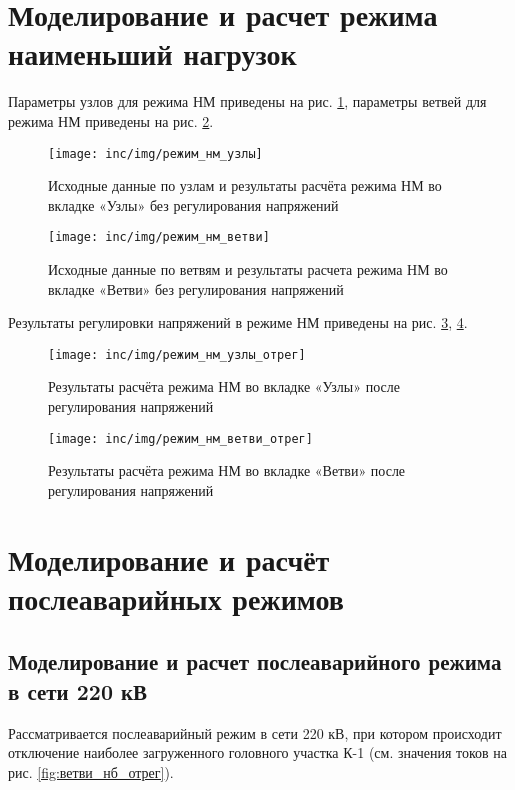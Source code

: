 \section{Моделирование и расчет режима наименьший нагрузок}

Параметры узлов для режима НМ приведены на рис. \ref{fig:режим_нм_узлы}, параметры ветвей для режима НМ приведены на рис. \ref{fig:режим_нм_ветви}.

\begin{figure}[H]
	\centering
	\texttt{[image: inc/img/режим\_нм\_узлы]}
	\caption{Исходные данные по узлам и результаты расчёта режима НМ во вкладке «Узлы» без регулирования напряжений}
	\label{fig:режим_нм_узлы}
\end{figure}

\begin{figure}[H]
	\centering
	\texttt{[image: inc/img/режим\_нм\_ветви]}
	\caption{Исходные данные по ветвям и результаты расчета режима НМ во вкладке «Ветви» без регулирования напряжений}
	\label{fig:режим_нм_ветви}
\end{figure}

Результаты регулировки напряжений в режиме НМ приведены на рис. \ref{fig:режим_нм_узлы_отрег}, \ref{fig:режим_нм_ветви_отрег}.

\begin{figure}[H]
	\centering
	\texttt{[image: inc/img/режим\_нм\_узлы\_отрег]}
	\caption{Результаты расчёта режима НМ во вкладке «Узлы» после регулирования напряжений}
	\label{fig:режим_нм_узлы_отрег}
\end{figure}

\begin{figure}[H]
	\centering
	\texttt{[image: inc/img/режим\_нм\_ветви\_отрег]}
	\caption{Результаты расчёта режима НМ во вкладке «Ветви» после регулирования напряжений}
	\label{fig:режим_нм_ветви_отрег}
\end{figure}

\section{Моделирование и расчёт послеаварийных режимов}

\subsection{Моделирование и расчет послеаварийного режима в сети 220 кВ}

Рассматривается послеаварийный режим в сети 220 кВ, при котором происходит отключение наиболее загруженного головного участка К-1 (см. значения токов на рис. \ref{fig:ветви_нб_отрег}).

